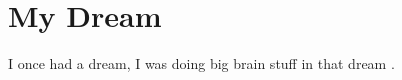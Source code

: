 \section{My Dream}

I once had a dream, I was doing big brain stuff in that dream \cite{CitekeyMastersthesis}.